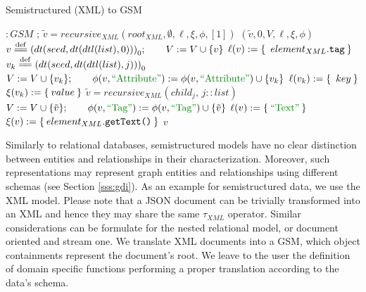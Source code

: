 \begin{algorithm}[!t]
	\caption{Semistructured (XML) to GSM}\label{alg:xmltonested}
	{
		\begin{minipage}{\linewidth}
			\begin{algorithmic}[1]
				 $\colon GSM$ 
				;
				\State $\tilde{v} = recursive_{XML}(root_{XML},\emptyset,\ell,\xi,\phi,[1])$
				\State \Return $(\tilde{v},0,V,\ell,\xi,\phi)$
				\EndFunction
				\State
				\State $v\overset{\mathrm{def}}{=\mathrel{\mkern-3mu}=} {(dt(seed,dt(dtl(list), 0)))}_0;\qquad V:=V\cup \{v\}$
					\State $\ell(v):=\Set{\;element_{XML}.\texttt{tag}}$
						\State $v_k\overset{\mathrm{def}}{=\mathrel{\mkern-3mu}=} {(dt(seed,dt(dtl(list),j)))}_0$
						\State $V:=V\cup \{v_k\};\qquad \phi(v,\ATTR):=\phi(v,\ATTR)\cup\{v_k\}$
						\State $\ell(v_k):=\Set{\;key}$
						\State $\xi(v_k):=\Set{value}$
					\EndFor
						\State $\tilde{v}= recursive_{XML}(child_j,\,j:: list)$
						\State $V:=V\cup\{\tilde{v}\};\qquad \phi(v,\mstr{Tag}):=\phi(v,\mstr{Tag})\cup\{\tilde{v}\}$
					\EndFor
				\Else
					\State $\ell(v):=\Set{\mstr{Text}}$
					\State $\xi(v):=\Set{element_{XML}.\texttt{getText()}}$
				\EndIf
				\State \Return $v$
				\EndProcedure
			\end{algorithmic}
	\end{minipage}}
\end{algorithm}
Similarly to relational databases,  semistructured models have no clear distinction between entities and relationships in their characterization. Moreover, such representations may represent graph entities and relationships using different schemas (see Section \vref{sss:gdi}). 
As an example for semistructured data, we use the XML model. Please note that a JSON document can be trivially transformed into an XML and hence they may share the same $\tau_{XML}$ operator.  Similar considerations can be formulate for the nested relational model, or document oriented and stream one. We  translate XML documents into a GSM, which object containments represent the document's root. We leave to the user the definition of domain specific functions performing a proper translation according to the data's schema.

